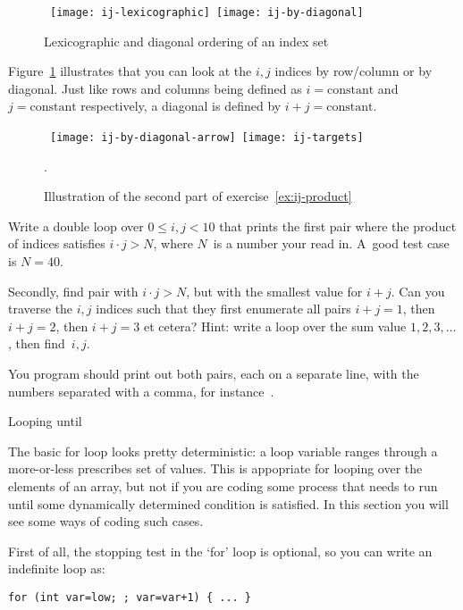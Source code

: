 \begin{figure}[ht]
  \hbox{%
    \texttt{[image: ij-lexicographic]}
    \texttt{[image: ij-by-diagonal]}
    }
  \caption{Lexicographic and diagonal ordering of an index set}  
  \label{fig:ij-lex}
\end{figure}

Figure~\ref{fig:ij-lex} illustrates that you can look at the $i,j$
indices by row/column or by diagonal. Just like rows and columns being
defined as $i=\mathrm{constant}$ and $j=\mathrm{constant}$
respectively,
a diagonal is defined by $i+j=\mathrm{constant}$.

\begin{figure}[ht]
  \hbox{%
    \texttt{[image: ij-by-diagonal-arrow]}
    \texttt{[image: ij-targets]}
    }
  \caption{Illustration of the second part of exercise~\ref{ex:ij-product}}.
  \label{fig:ij-min}
\end{figure}

\begin{exercise}
  \label{ex:ij-product}
  Write a double loop over $0\leq i,j<10$ that prints the first pair
  where the product of indices satisfies $i\cdot j> N$, where $N$~is a
  number your read in. A~good test case is $N=40$.

  Secondly, find pair with $i\cdot j>N$, but with the smallest value for $i+j$.
  Can you traverse the $i,j$ indices such that they first enumerate
  all pairs $i+j=1$, then $i+j=2$, then $i+j=3$ et cetera? Hint:
  write a loop over the sum value $1,2,3,\ldots$, then find~$i,j$.

  You program should print out both pairs, each on a separate line,
  with the numbers separated with a comma, for instance~.
\end{exercise}

 {Looping until}
\label{sec:loopuntil}

The basic for loop looks pretty deterministic: a loop variable ranges
through a more-or-less prescribes set of values. This is appopriate
for looping over the elements of an array, but not if you are coding
some process that needs to run until some dynamically determined
condition is satisfied. In this section you will see some ways of
coding such cases.

First of all, the stopping test in the `for' loop is optional, so you
can write an indefinite loop as:
\begin{lstlisting}
for (int var=low; ; var=var+1) { ... }
\end{lstlisting}

